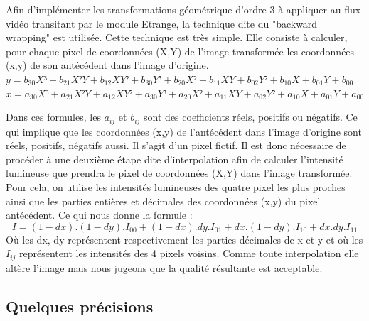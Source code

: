 {Afin d'implémenter les transformations géométrique d'ordre 3 à appliquer au flux vidéo transitant par le module Etrange, la technique dite du "backward wrapping" est utilisée. Cette technique est très simple. Elle consiste à calculer, pour chaque pixel de coordonnées (X,Y) de l'image transformée les coordonnées (x,y) de son antécédent dans l'image d'origine.
{
\newline
\newline
$
y = b_{30}X³ + b_{21}X²Y + b_{12}XY² + b_{30}Y³

  + b_{20}X² + b_{11}XY  + b_{02}Y²
  
  + b_{10}X  + b_{01}Y
  
  + b_{00}
$
\newline
$
x = a_{30}X³ + a_{21}X²Y + a_{12}XY² + a_{30}Y³

  + a_{20}X² + a_{11}XY  + a_{02}Y²
 
  + a_{10}X  + a_{01}Y
  
  + a_{00}
$
}
\newline

{Dans ces formules, les $a_{ij}$ et $b_{ij}$ sont des coefficients réels, positifs ou négatifs. Ce qui implique que les coordonnées (x,y) de l'antécédent dans l'image d'origine sont réels, positifs, négatifs aussi. Il s'agit d'un pixel fictif.
Il est donc nécessaire de procéder à une deuxième étape dite d'interpolation afin de calculer l'intensité lumineuse que prendra le pixel de coordonnées (X,Y) dans l'image transformée. Pour cela, on utilise les intensités lumineuses des quatre pixel les plus proches ainsi que les parties entières et décimales des coordonnées (x,y) du pixel antécédent. Ce qui nous donne la formule :
\newline
$$
I = (1-dx).(1-dy).I_{00} + (1-dx).dy.I_{01} + dx.(1-dy).I_{10} + dx.dy.I_{11}
$$
\newline
Où les dx, dy représentent respectivement les parties décimales de x et y et où les $I_{ij}$ représentent les intensités des 4 pixels voisins. Comme toute interpolation elle altère l'image mais nous jugeons que la qualité résultante est acceptable.
\newline
\newline
}
	\subsection*{Quelques précisions}
{



}



}
